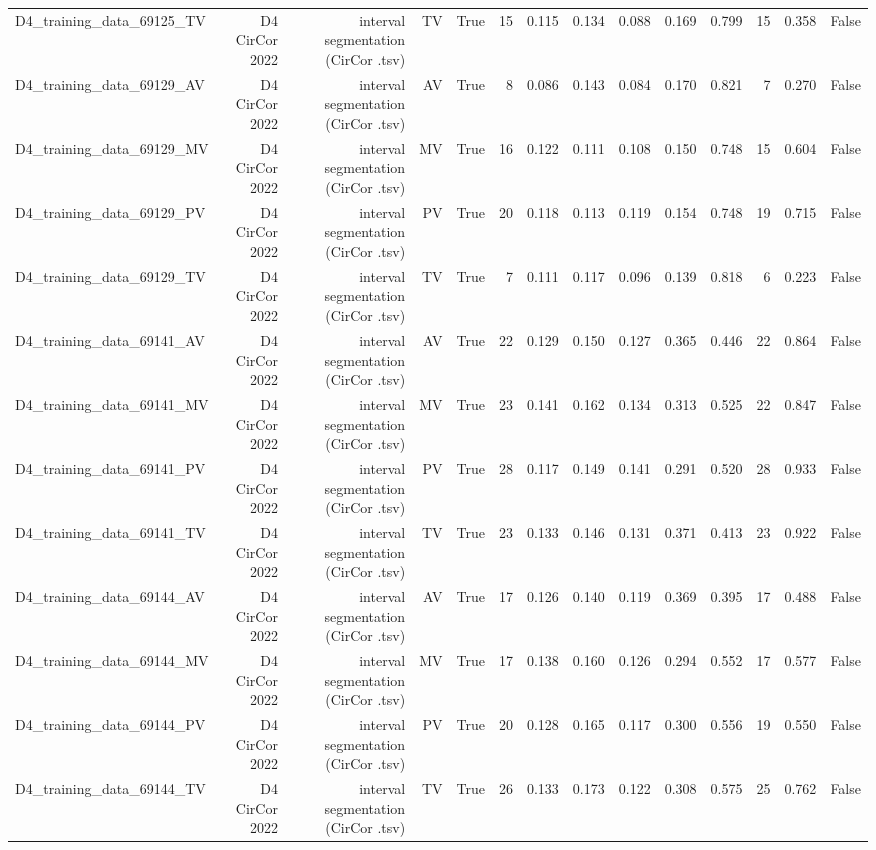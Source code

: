 \begin{table}[htbp]
\begin{tabular}{lrrrrrrrrrrrrr}
    D4\_training\_data\_69125\_TV & D4 CirCor 2022 & interval segmentation (CirCor .tsv) & TV & True & 15 & 0.115 & 0.134 & 0.088 & 0.169 & 0.799 & 15 & 0.358 & False \\
    D4\_training\_data\_69129\_AV & D4 CirCor 2022 & interval segmentation (CirCor .tsv) & AV & True & 8 & 0.086 & 0.143 & 0.084 & 0.170 & 0.821 & 7 & 0.270 & False \\
    D4\_training\_data\_69129\_MV & D4 CirCor 2022 & interval segmentation (CirCor .tsv) & MV & True & 16 & 0.122 & 0.111 & 0.108 & 0.150 & 0.748 & 15 & 0.604 & False \\
    D4\_training\_data\_69129\_PV & D4 CirCor 2022 & interval segmentation (CirCor .tsv) & PV & True & 20 & 0.118 & 0.113 & 0.119 & 0.154 & 0.748 & 19 & 0.715 & False \\
    D4\_training\_data\_69129\_TV & D4 CirCor 2022 & interval segmentation (CirCor .tsv) & TV & True & 7 & 0.111 & 0.117 & 0.096 & 0.139 & 0.818 & 6 & 0.223 & False \\
    D4\_training\_data\_69141\_AV & D4 CirCor 2022 & interval segmentation (CirCor .tsv) & AV & True & 22 & 0.129 & 0.150 & 0.127 & 0.365 & 0.446 & 22 & 0.864 & False \\
    D4\_training\_data\_69141\_MV & D4 CirCor 2022 & interval segmentation (CirCor .tsv) & MV & True & 23 & 0.141 & 0.162 & 0.134 & 0.313 & 0.525 & 22 & 0.847 & False \\
    D4\_training\_data\_69141\_PV & D4 CirCor 2022 & interval segmentation (CirCor .tsv) & PV & True & 28 & 0.117 & 0.149 & 0.141 & 0.291 & 0.520 & 28 & 0.933 & False \\
    D4\_training\_data\_69141\_TV & D4 CirCor 2022 & interval segmentation (CirCor .tsv) & TV & True & 23 & 0.133 & 0.146 & 0.131 & 0.371 & 0.413 & 23 & 0.922 & False \\
    D4\_training\_data\_69144\_AV & D4 CirCor 2022 & interval segmentation (CirCor .tsv) & AV & True & 17 & 0.126 & 0.140 & 0.119 & 0.369 & 0.395 & 17 & 0.488 & False \\
    D4\_training\_data\_69144\_MV & D4 CirCor 2022 & interval segmentation (CirCor .tsv) & MV & True & 17 & 0.138 & 0.160 & 0.126 & 0.294 & 0.552 & 17 & 0.577 & False \\
    D4\_training\_data\_69144\_PV & D4 CirCor 2022 & interval segmentation (CirCor .tsv) & PV & True & 20 & 0.128 & 0.165 & 0.117 & 0.300 & 0.556 & 19 & 0.550 & False \\
    D4\_training\_data\_69144\_TV & D4 CirCor 2022 & interval segmentation (CirCor .tsv) & TV & True & 26 & 0.133 & 0.173 & 0.122 & 0.308 & 0.575 & 25 & 0.762 & False \\

\end{tabular}
\end{table}
